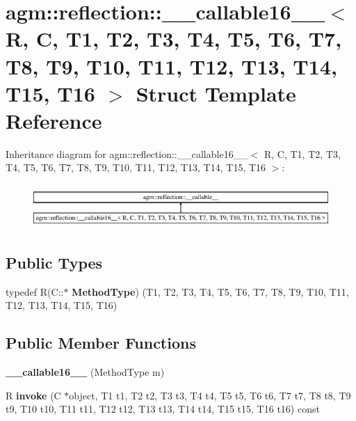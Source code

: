 \hypertarget{structagm_1_1reflection_1_1____callable16____}{}\section{agm\+:\+:reflection\+:\+:\+\_\+\+\_\+callable16\+\_\+\+\_\+$<$ R, C, T1, T2, T3, T4, T5, T6, T7, T8, T9, T10, T11, T12, T13, T14, T15, T16 $>$ Struct Template Reference}
\label{structagm_1_1reflection_1_1____callable16____}
Inheritance diagram for agm\+:\+:reflection\+:\+:\+\_\+\+\_\+callable16\+\_\+\+\_\+$<$ R, C, T1, T2, T3, T4, T5, T6, T7, T8, T9, T10, T11, T12, T13, T14, T15, T16 $>$\+:\begin{figure}[H]
\begin{center}
\leavevmode
\includegraphics[height=1.694402cm]{structagm_1_1reflection_1_1____callable16____}
\end{center}
\end{figure}
\subsection*{Public Types}
\begin{DoxyCompactItemize}
\item 
typedef R(C\+::$\ast$ {\bfseries Method\+Type}) (T1, T2, T3, T4, T5, T6, T7, T8, T9, T10, T11, T12, T13, T14, T15, T16)\hypertarget{structagm_1_1reflection_1_1____callable16_____aeeea8723d2b463abe984817bf85e1028}{}\label{structagm_1_1reflection_1_1____callable16_____aeeea8723d2b463abe984817bf85e1028}

\end{DoxyCompactItemize}
\subsection*{Public Member Functions}
\begin{DoxyCompactItemize}
\item 
{\bfseries \+\_\+\+\_\+callable16\+\_\+\+\_\+} (Method\+Type m)\hypertarget{structagm_1_1reflection_1_1____callable16_____aeda29428b1c77c5c021744e86257ab42}{}\label{structagm_1_1reflection_1_1____callable16_____aeda29428b1c77c5c021744e86257ab42}

\item 
R {\bfseries invoke} (C $\ast$object, T1 t1, T2 t2, T3 t3, T4 t4, T5 t5, T6 t6, T7 t7, T8 t8, T9 t9, T10 t10, T11 t11, T12 t12, T13 t13, T14 t14, T15 t15, T16 t16) const \hypertarget{structagm_1_1reflection_1_1____callable16_____a42f20d3ba490a838f82fa5f138d4ff9d}{}\label{structagm_1_1reflection_1_1____callable16_____a42f20d3ba490a838f82fa5f138d4ff9d}

\end{DoxyCompactItemize}
